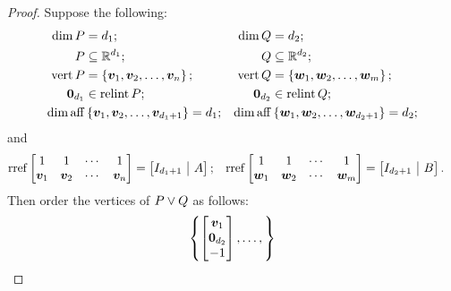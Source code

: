 \begin{proof}
    Suppose the following:
        \begin{align*}
            \dim P&=d_1;&
                \dim Q&=d_2;\\
            P&\subseteq\mathbb{R}^{d_1};&
                Q&\subseteq\mathbb{R}^{d_2};\\
            \operatorname{vert} P&=\left\{\bm{v}_1,\bm{v}_2,\dotsc,\bm{v}_n\right\};&
                \operatorname{vert} Q&=\left\{\bm{w}_1,\bm{w}_2,\dotsc,\bm{w}_m\right\};\\
            \bm{0}_{d_1}&\in\operatorname{relint} P;&
                \bm{0}_{d_2}&\in\operatorname{relint} Q;\\
            \dim\operatorname{aff}&\left\{\bm{v}_1,\bm{v}_2,\dotsc,\bm{v}_{d_1+1}\right\}=d_1;&
                \dim\operatorname{aff}&\left\{\bm{w}_1,\bm{w}_2,\dotsc,\bm{w}_{d_2+1}\right\}=d_2;
        \end{align*}
    and
        \begin{align*}
            \rref
                    \begin{bmatrix}
                        1       &   1       &   \cdots  &   1       \\
                        \ve v_1 &   \ve v_2 &   \cdots  &   \ve v_n
                    \end{bmatrix}
                        &=
                        \left[
                            \begin{array}{@{}c|c@{}}
                                I_{d_1+1} & A
                            \end{array}
                        \right]; &
                \rref
                    \begin{bmatrix}
                        1       &   1       &   \cdots  &   1       \\
                        \ve w_1 &   \ve w_2 &   \cdots  &   \ve w_m
                    \end{bmatrix}
                        &=
                        \left[
                            \begin{array}{@{}c|c@{}}
                                I_{d_2+1} & B
                            \end{array}
                        \right].
        \end{align*}
    Then order the vertices of \(P\vee Q\) as follows:
        \begin{align*}
                \left\{
                \begin{bmatrix} \bm{v}_1\\       \bm{0}_{d_2}\\   -1  \end{bmatrix},\dotsc,
\right\}
\end{align*}
\end{proof}
